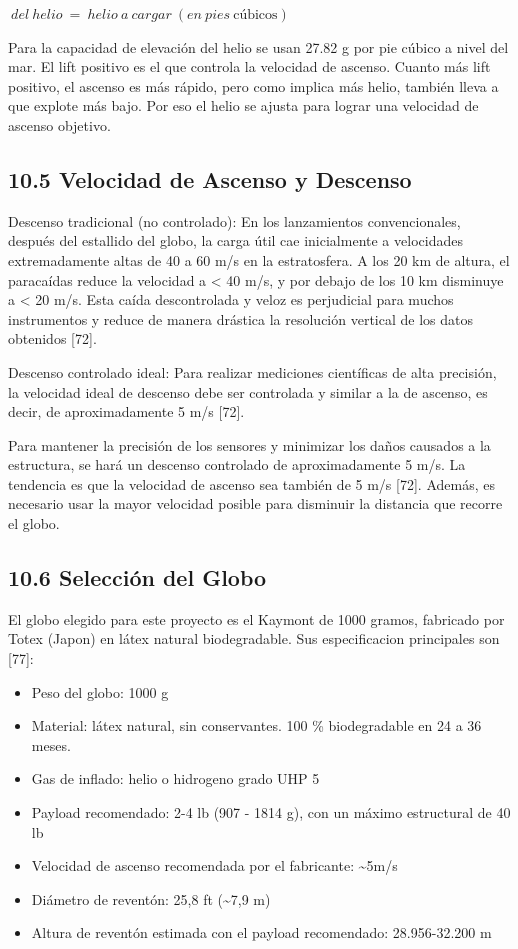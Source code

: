 \documentclass[12pt,a4paper]{article}
\begin{document}
\(\ del\ helio\  = \ helio\ a\ cargar\ (en\ pies\ \text{cúbicos})\ \)

Para la capacidad de elevación del helio se usan 27.82 g por pie cúbico a nivel del mar. El lift positivo es el que controla la velocidad de ascenso. Cuanto más lift positivo, el ascenso es más rápido, pero como implica más helio, también lleva a que explote más bajo. Por eso el helio se ajusta para lograr una velocidad de ascenso objetivo.

\subsection{10.5 Velocidad de Ascenso y Descenso}\label{velocidad-de-ascenso-y-descenso}

Descenso tradicional (no controlado): En los lanzamientos convencionales, después del estallido del globo, la carga útil cae inicialmente a velocidades extremadamente altas de 40 a 60 m/s en la estratosfera. A los 20 km de altura, el paracaídas reduce la velocidad a \textless{} 40 m/s, y por debajo de los 10 km disminuye a \textless{} 20 m/s. Esta caída descontrolada y veloz es perjudicial para muchos instrumentos y reduce de manera drástica la resolución vertical de los datos obtenidos {[}72{]}.

Descenso controlado ideal: Para realizar mediciones científicas de alta precisión, la velocidad ideal de descenso debe ser controlada y similar a la de ascenso, es decir, de aproximadamente 5 m/s {[}72{]}.

Para mantener la precisión de los sensores y minimizar los daños causados a la estructura, se hará un descenso controlado de aproximadamente 5 m/s. La tendencia es que la velocidad de ascenso sea también de 5 m/s {[}72{]}. Además, es necesario usar la mayor velocidad posible para disminuir la distancia que recorre el globo.

\subsection{10.6 Selección del Globo}\label{selecciuxf3n-del-globo}

El globo elegido para este proyecto es el Kaymont de 1000 gramos, fabricado por Totex (Japon) en látex natural biodegradable. Sus especificacion principales son {[}77{]}:

\begin{itemize}
\item
  Peso del globo: 1000 g
\item
  Material: látex natural, sin conservantes. 100 \% biodegradable en 24 a 36 meses.
\item
  Gas de inflado: helio o hidrogeno grado UHP 5
\item
  Payload recomendado: 2-4 lb (907 - 1814 g), con un máximo estructural de 40 lb
\item
  Velocidad de ascenso recomendada por el fabricante: \textasciitilde5m/s
\item
  Diámetro de reventón: 25,8 ft (\textasciitilde7,9 m)
\item
  Altura de reventón estimada con el payload recomendado: 28.956-32.200 m
\end{itemize}
\end{document}
